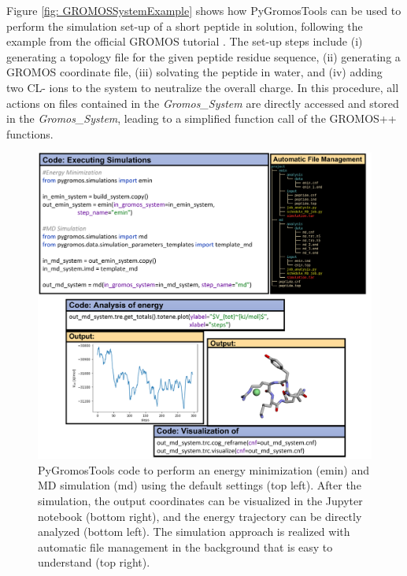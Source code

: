 Figure \ref{fig: GROMOSSystemExample} shows how PyGromosTools can be used to perform the simulation set-up of a short peptide in solution, following the example from the official GROMOS tutorial \cite{Lier2020}. The set-up steps include (i) generating a topology file for the given peptide residue sequence, (ii) generating a GROMOS coordinate file, (iii) solvating the peptide in water, and (iv) adding two CL- ions to the system to neutralize the overall charge. In this procedure, all actions on files contained in the \textit{Gromos\_System} are directly accessed and stored in the \textit{Gromos\_System}, leading to a simplified function call of the GROMOS++ functions. 



\begin{figure}[h!]
    \centering
    \includegraphics[width=\textwidth]{fig/ApplicationExamples/codeExample_GROMOSSystemSimulation.png}
    \caption{PyGromosTools code to perform an energy minimization (emin) and MD simulation (md) using the default settings (top left). After the simulation, the output coordinates can be visualized in the Jupyter notebook (bottom right), and the energy trajectory can be directly analyzed (bottom left). The simulation approach is realized with automatic file management in the background that is easy to understand (top right).}
    \label{fig: GROMOSSystemSimulationExample}
\end{figure}

